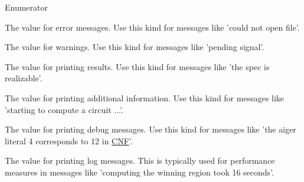 \begin{Desc}
\item[Enumerator]\par
\begin{description}
\item[{\em 
\hypertarget{classLogger_ac9e601f90bf326ce2088de52018861dca482a49db2a0d40e2ae358619edb1633e}{E\-R\-R}\label{classLogger_ac9e601f90bf326ce2088de52018861dca482a49db2a0d40e2ae358619edb1633e}
}]The value for error messages. Use this kind for messages like 'could not open file'. \item[{\em 
\hypertarget{classLogger_ac9e601f90bf326ce2088de52018861dca90d291baa55088591aae64883cfc58bd}{W\-R\-N}\label{classLogger_ac9e601f90bf326ce2088de52018861dca90d291baa55088591aae64883cfc58bd}
}]The value for warnings. Use this kind for messages like 'pending signal'. \item[{\em 
\hypertarget{classLogger_ac9e601f90bf326ce2088de52018861dca97ed8522dfcbb2cdf29c7f46e583f42f}{R\-E\-S}\label{classLogger_ac9e601f90bf326ce2088de52018861dca97ed8522dfcbb2cdf29c7f46e583f42f}
}]The value for printing results. Use this kind for messages like 'the spec is realizable'. \item[{\em 
\hypertarget{classLogger_ac9e601f90bf326ce2088de52018861dca174739f9b95ebbf75fbb89001f72443b}{I\-N\-F}\label{classLogger_ac9e601f90bf326ce2088de52018861dca174739f9b95ebbf75fbb89001f72443b}
}]The value for printing additional information. Use this kind for messages like 'starting to compute a circuit ...'. \item[{\em 
\hypertarget{classLogger_ac9e601f90bf326ce2088de52018861dcaecb59ecf12f943da56b6944a3053dc09}{D\-B\-G}\label{classLogger_ac9e601f90bf326ce2088de52018861dcaecb59ecf12f943da56b6944a3053dc09}
}]The value for printing debug messages. Use this kind for messages like 'the aiger literal 4 corresponds to 12 in \hyperlink{classCNF}{C\-N\-F}'. \item[{\em 
\hypertarget{classLogger_ac9e601f90bf326ce2088de52018861dca07be7495a7931bee16f5d94b3671f5de}{L\-O\-G}\label{classLogger_ac9e601f90bf326ce2088de52018861dca07be7495a7931bee16f5d94b3671f5de}
}]The value for printing log messages. This is typically used for performance measures in messages like 'computing the winning region took 16 seconds'. \end{description}
\end{Desc}


